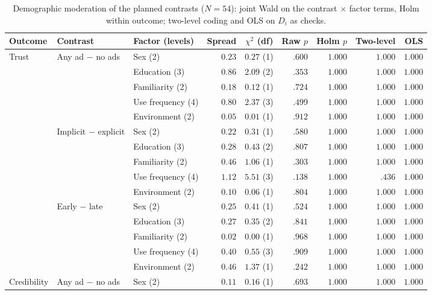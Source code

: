 \begin{table}[H]
\centering
\footnotesize
\caption{Demographic moderation of the planned contrasts (\(N=54\)): joint Wald on the contrast \(\times\) factor terms, Holm within outcome; two-level coding and OLS on \(D_i\) as checks.}
\label{tab:beh-demographics}
\setlength{\tabcolsep}{3.5pt}
\begin{tabular}{@{}ll l r r r r r r@{}}
\toprule
Outcome & Contrast & Factor (levels) & Spread & \(\chi^2\) (df) & Raw \(p\) & Holm \(p\) & Two-level & OLS \\
\midrule
Trust & Any ad \(-\) no ads & Sex (2) & $0.23$ & $0.27$ (1) & $.600$ & $1.000$ & $1.000$ & $1.000$ \\
 &  & Education (3) & $0.86$ & $2.09$ (2) & $.353$ & $1.000$ & $1.000$ & $1.000$ \\
 &  & Familiarity (2) & $0.18$ & $0.12$ (1) & $.724$ & $1.000$ & $1.000$ & $1.000$ \\
 &  & Use frequency (4) & $0.80$ & $2.37$ (3) & $.499$ & $1.000$ & $1.000$ & $1.000$ \\
 &  & Environment (2) & $0.05$ & $0.01$ (1) & $.912$ & $1.000$ & $1.000$ & $1.000$ \\
 & Implicit \(-\) explicit & Sex (2) & $0.22$ & $0.31$ (1) & $.580$ & $1.000$ & $1.000$ & $1.000$ \\
 &  & Education (3) & $0.28$ & $0.43$ (2) & $.807$ & $1.000$ & $1.000$ & $1.000$ \\
 &  & Familiarity (2) & $0.46$ & $1.06$ (1) & $.303$ & $1.000$ & $1.000$ & $1.000$ \\
 &  & Use frequency (4) & $1.12$ & $5.51$ (3) & $.138$ & $1.000$ & $.436$ & $1.000$ \\
 &  & Environment (2) & $0.10$ & $0.06$ (1) & $.804$ & $1.000$ & $1.000$ & $1.000$ \\
 & Early \(-\) late & Sex (2) & $0.25$ & $0.41$ (1) & $.524$ & $1.000$ & $1.000$ & $1.000$ \\
 &  & Education (3) & $0.27$ & $0.35$ (2) & $.841$ & $1.000$ & $1.000$ & $1.000$ \\
 &  & Familiarity (2) & $0.02$ & $0.00$ (1) & $.968$ & $1.000$ & $1.000$ & $1.000$ \\
 &  & Use frequency (4) & $0.40$ & $0.55$ (3) & $.909$ & $1.000$ & $1.000$ & $1.000$ \\
 &  & Environment (2) & $0.46$ & $1.37$ (1) & $.242$ & $1.000$ & $1.000$ & $1.000$ \\
\midrule
Credibility & Any ad \(-\) no ads & Sex (2) & $0.11$ & $0.16$ (1) & $.693$ & $1.000$ & $1.000$ & $1.000$ \\

\end{tabular}
\end{table}
